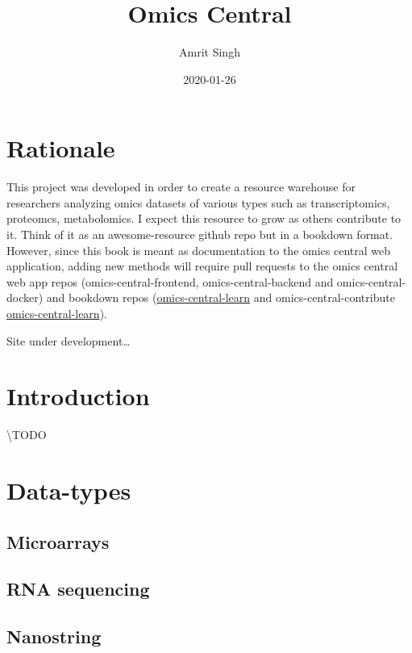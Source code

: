 \documentclass[]{book}
\title{Omics Central}
\author{Amrit Singh}
\date{2020-01-26}
\begin{document}
\maketitle

{
\setcounter{tocdepth}{1}
\tableofcontents
}
\chapter{Rationale}\label{rationale}

This project was developed in order to create a resource warehouse for
researchers analyzing omics datasets of various types such as
transcriptomics, proteomcs, metabolomics. I expect this resource to grow
as others contribute to it. Think of it as an awesome-resource github
repo but in a bookdown format. However, since this book is meant as
documentation to the omics central web application, adding new methods
will require pull requests to the omics central web app repos
(omics-central-frontend, omics-central-backend and omics-central-docker)
and bookdown repos
(\href{https://github.com/singha53/omics-central-learn}{omics-central-learn}
and omics-central-contribute
\href{https://github.com/singha53/omics-central-contribute}{omics-central-learn}).

Site under development\ldots{}

\chapter{Introduction}\label{intro}

\textbackslash{}TODO

\chapter{Data-types}\label{data-types}

\section{Microarrays}\label{microarrays}

\section{RNA sequencing}\label{rna-sequencing}

\section{Nanostring}\label{nanostring}
\end{document}
